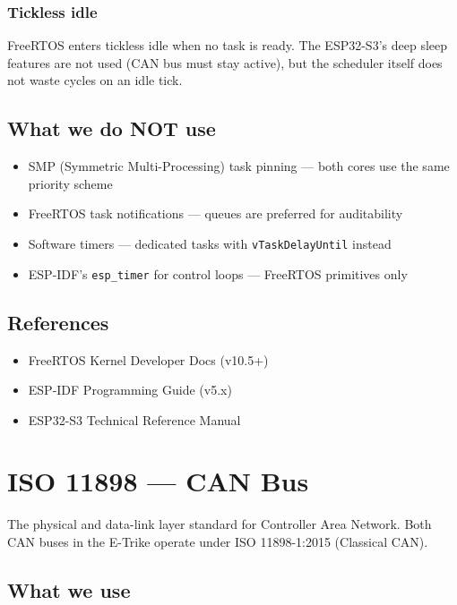 \documentclass[12pt,a4paper,oneside]{report}
\providecommand{\tightlist}{\setlength{\itemsep}{0pt}\setlength{\parskip}{0pt}}
\begin{document}
\subsection{Tickless idle}\label{tickless-idle}

FreeRTOS enters tickless idle when no task is ready. The ESP32-S3's deep sleep
features are not used (CAN bus must stay active), but the scheduler itself does
not waste cycles on an idle tick.

\section{What we do NOT use}\label{what-we-do-not-use}

\begin{itemize}
\tightlist
\item
  SMP (Symmetric Multi-Processing) task pinning --- both cores use the same
  priority scheme
\item
  FreeRTOS task notifications --- queues are preferred for auditability
\item
  Software timers --- dedicated tasks with \texttt{vTaskDelayUntil} instead
\item
  ESP-IDF's \texttt{esp\_timer} for control loops --- FreeRTOS primitives only
\end{itemize}

\section{References}\label{references}

\begin{itemize}
\tightlist
\item
  FreeRTOS Kernel Developer Docs (v10.5+)
\item
  ESP-IDF Programming Guide (v5.x)
\item
  ESP32-S3 Technical Reference Manual
\end{itemize}


\chapter{ISO 11898 --- CAN Bus}\label{iso-11898-can-bus}

The physical and data-link layer standard for Controller Area Network. Both CAN
buses in the E-Trike operate under ISO 11898-1:2015 (Classical CAN).

\section{What we use}\label{what-we-use}
\end{document}
